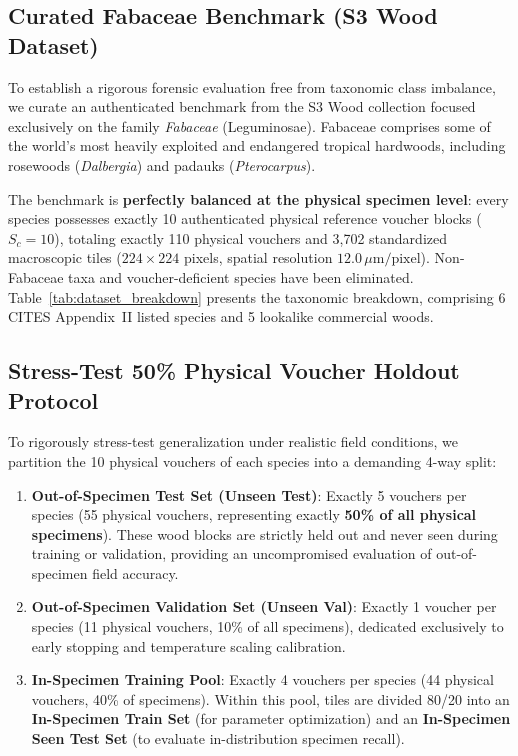 \documentclass[a4paper,fleqn]{cas-sc}
\begin{document}
\subsection{Curated Fabaceae Benchmark (S3 Wood Dataset)}
To establish a rigorous forensic evaluation free from taxonomic class imbalance, we curate an authenticated benchmark from the S3 Wood collection focused exclusively on the family \textit{Fabaceae} (Leguminosae). Fabaceae comprises some of the world's most heavily exploited and endangered tropical hardwoods, including rosewoods (\textit{Dalbergia}) and padauks (\textit{Pterocarpus}).

The benchmark is \textbf{perfectly balanced at the physical specimen level}: every species possesses exactly 10 authenticated physical reference voucher blocks ($S_c = 10$), totaling exactly 110 physical vouchers and 3,702 standardized macroscopic tiles ($224 \times 224$ pixels, spatial resolution $12.0\,\mu\text{m/pixel}$). Non-Fabaceae taxa and voucher-deficient species have been eliminated. Table~\ref{tab:dataset_breakdown} presents the taxonomic breakdown, comprising 6 CITES Appendix~II listed species and 5 lookalike commercial woods.

\subsection{Stress-Test 50\% Physical Voucher Holdout Protocol}
To rigorously stress-test generalization under realistic field conditions, we partition the 10 physical vouchers of each species into a demanding 4-way split:
\begin{enumerate}
    \item \textbf{Out-of-Specimen Test Set (Unseen Test)}: Exactly 5 vouchers per species (55 physical vouchers, representing exactly \textbf{50\% of all physical specimens}). These wood blocks are strictly held out and never seen during training or validation, providing an uncompromised evaluation of out-of-specimen field accuracy.
    \item \textbf{Out-of-Specimen Validation Set (Unseen Val)}: Exactly 1 voucher per species (11 physical vouchers, 10\% of all specimens), dedicated exclusively to early stopping and temperature scaling calibration.
    \item \textbf{In-Specimen Training Pool}: Exactly 4 vouchers per species (44 physical vouchers, 40\% of specimens). Within this pool, tiles are divided 80/20 into an \textbf{In-Specimen Train Set} (for parameter optimization) and an \textbf{In-Specimen Seen Test Set} (to evaluate in-distribution specimen recall).
\end{enumerate}
\end{document}
